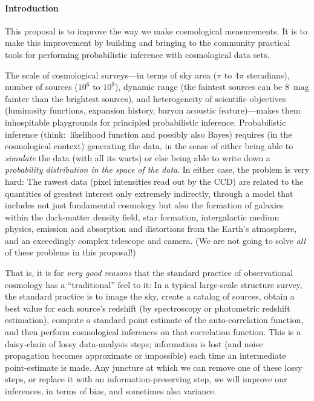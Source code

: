 \documentclass[12pt]{article}
\begin{document}
\sloppy\sloppypar

\paragraph{Introduction}
This proposal is to improve the way we make cosmological measurements.
It is to make this improvement by building and bringing to the
community practical tools for performing probabilistic inference with
cosmological data sets.

The scale of cosmological surveys---in terms of sky area ($\pi$ to
$4\pi$ steradians), number of sources ($10^6$ to $10^9$), dynamic
range (the faintest sources can be 8~mag fainter than the brightest
sources), and heterogeneity of scientific objectives (luminosity
functions, expansion history, baryon acoustic feature)---makes them
inhospitable playgrounds for principled probabilistic inference.
Probabilistic inference (think:\ likelihood function and possibly also
Bayes) requires (in the cosmological context) generating the data, in
the sense of either being able to \emph{simulate} the data (with all
its warts) or else being able to write down a \emph{probability
  distribution in the space of the data}.
In either case, the problem is very hard:
The rawest data (pixel intensities read out by the CCD) are related to
the quantities of greatest interest only extremely indirectly, through
a model that includes not just fundamental cosmology but also the
formation of galaxies within the dark-matter density field, star
formation, intergalactic medium physics, emission and absorption and
distortions from the Earth's atmosphere, and an exceedingly complex
telescope and camera.
(We are not going to solve \emph{all} of these problems in this proposal!)

That is, it is for \emph{very good reasons} that the standard practice
of observational cosmology has a ``traditional'' feel to it:
In a typical large-scale structure survey, the standard practice is to
image the sky, create a catalog of sources, obtain a best value for
each source's redshift (by spectroscopy or photometric redshift
estimation), compute a standard point estimate of the auto-correlation
function, and then perform cosmological inferences on that correlation
function.
This is a daisy-chain of lossy data-analysis steps; information is
lost (and noise propagation becomes approximate or impossible) each
time an intermediate point-estimate is made.
Any juncture at which we can remove one of these lossy steps, or
replace it with an information-preserving step, we will improve our
inferences, in terms of bias, and sometimes also variance.
\end{document}
